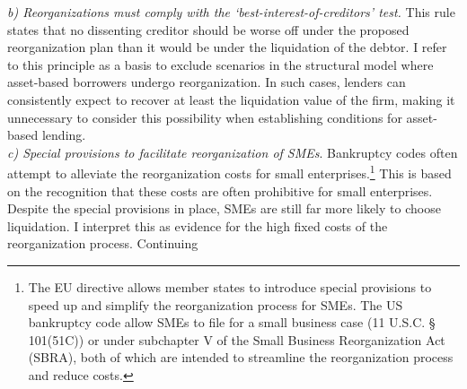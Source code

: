 \documentclass[12pt]{article}
\begin{document}
\textit{b) Reorganizations must comply with the `best-interest-of-creditors' test.} This rule states that no dissenting creditor should be worse off under the proposed reorganization plan than it would be under the liquidation of the debtor. I refer to this principle as a basis to exclude scenarios in the structural model where asset-based borrowers undergo reorganization. In such cases, lenders can consistently expect to recover at least the liquidation value of the firm, making it unnecessary to consider this possibility when establishing conditions for asset-based lending. \vspace{3mm} \\
\textit{c) Special provisions to facilitate reorganization of SMEs}. Bankruptcy codes often attempt to alleviate the reorganization costs for small enterprises.\footnote{The EU directive allows member states to introduce special provisions to speed up and simplify the reorganization process for SMEs. The US bankruptcy code allow SMEs to file for a small business case (11 U.S.C. § 101(51C)) or under subchapter V of the Small Business Reorganization Act (SBRA), both of which are intended to streamline the reorganization process and reduce costs.} This is based on the recognition that these costs are often prohibitive for small enterprises. Despite the special provisions in place, SMEs are still far more likely to choose liquidation. I interpret this as evidence for the high fixed costs of the reorganization process. Continuing
\end{document}
